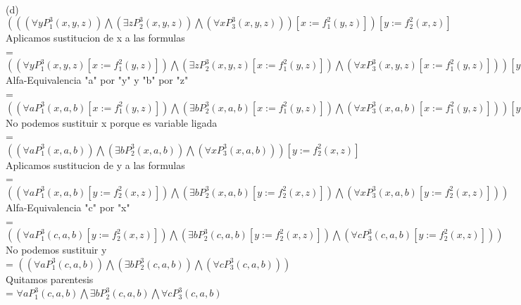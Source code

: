 \documentclass{article}
\begin{document}
\\
(d) $(((\forall yP^3_1(x,y,z))\bigwedge (\exists zP^3_2(x,y,z))\bigwedge (\forall xP^3_3(x,y,z)))[x:=f^2_1(y,z)])[y:=f^2_2(x,z)]$\\
Aplicamos sustitucion de x a las formulas\\
= $((\forall yP^3_1(x,y,z)[x:=f^2_1(y,z)])\bigwedge (\exists zP^3_2(x,y,z)[x:=f^2_1(y,z)])\bigwedge (\forall xP^3_3(x,y,z)[x:=f^2_1(y,z)]))[y:=f^2_2(x,z)]$ \\
Alfa-Equivalencia "a" por "y" y "b" por "z"\\
= $((\forall aP^3_1(x,a,b)[x:=f^2_1(y,z)])\bigwedge (\exists bP^3_2(x,a,b)[x:=f^2_1(y,z)])\bigwedge (\forall xP^3_3(x,a,b)[x:=f^2_1(y,z)]))[y:=f^2_2(x,z)]$ \\
No podemos sustituir x porque es variable ligada\\
= $((\forall aP^3_1(x,a,b))\bigwedge (\exists bP^3_2(x,a,b))\bigwedge (\forall xP^3_3(x,a,b)))[y:=f^2_2(x,z)]$ \\
Aplicamos sustitucion de y a las formulas\\
= $((\forall aP^3_1(x,a,b)[y:=f^2_2(x,z)])\bigwedge (\exists bP^3_2(x,a,b)[y:=f^2_2(x,z)])\bigwedge (\forall xP^3_3(x,a,b)[y:=f^2_2(x,z)]))$ \\
Alfa-Equivalencia "c" por "x"\\
= $((\forall aP^3_1(c,a,b)[y:=f^2_2(x,z)])\bigwedge (\exists bP^3_2(c,a,b)[y:=f^2_2(x,z)])\bigwedge (\forall cP^3_3(c,a,b)[y:=f^2_2(x,z)]))$ \\
No podemos sustituir y \\
= $((\forall aP^3_1(c,a,b))\bigwedge (\exists bP^3_2(c,a,b))\bigwedge (\forall cP^3_3(c,a,b)))$ \\
Quitamos parentesis\\
= $\forall aP^3_1(c,a,b)\bigwedge \exists bP^3_2(c,a,b)\bigwedge \forall cP^3_3(c,a,b)$ \\


\maketitle
\end{document}
